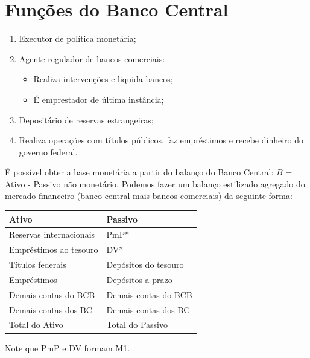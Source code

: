 \documentclass[12pt,a4paper,oneside,brazil]{abntex2}
\begin{document}
\section{Funções do Banco Central}
\begin{enumerate}
\item Executor de política monetária;
\item Agente regulador de bancos comerciais:
\begin{itemize}
\item Realiza intervenções e liquida bancos;
\item É emprestador de última instância;
\end{itemize}
\item Depositário de reservas estrangeiras;
\item Realiza operações com títulos públicos, faz empréstimos e recebe dinheiro do governo federal.
\end{enumerate}
É possível obter a base monetária a partir do balanço do Banco Central: $B$ = Ativo - Passivo não monetário. Podemos fazer um balanço estilizado agregado do mercado financeiro (banco central mais bancos comerciais) da seguinte forma:

\begin{table}[h]
\centering
\begin{tabular}{|l|l|}
\hline
Ativo                   & Passivo              \\ \hline
Reservas internacionais & PmP*                 \\ \hline
Empréstimos ao tesouro  & DV*                  \\ \hline
Títulos federais        & Depósitos do tesouro \\ \hline
Empréstimos             & Depósitos a prazo    \\ \hline
Demais contas do BCB    & Demais contas do BCB \\ \hline
Demais contas dos BC    & Demais contas dos BC \\ \hline
Total do Ativo          & Total do Passivo     \\ \hline
\end{tabular}
\end{table}

Note que PmP e DV formam M1.
\end{document}
